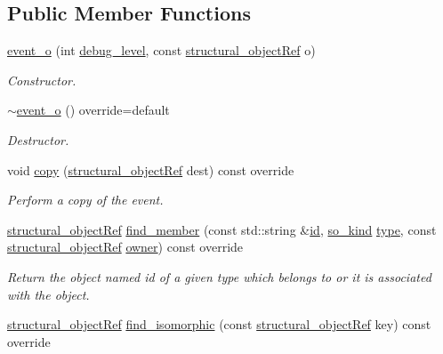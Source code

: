 \subsection*{Public Member Functions}
\begin{DoxyCompactItemize}
\item 
\hyperlink{classevent__o_a1c84057bbc0bd928bc9245e9cb7fed89}{event\+\_\+o} (int \hyperlink{classstructural__object_ac2744292aa7f0fca3742133d16bb3201}{debug\+\_\+level}, const \hyperlink{structural__objects_8hpp_a8ea5f8cc50ab8f4c31e2751074ff60b2}{structural\+\_\+object\+Ref} o)
\begin{DoxyCompactList}\small\item\em Constructor. \end{DoxyCompactList}\item 
\hyperlink{classevent__o_aa0e27b6701501b500ec7ab11acee2eea}{$\sim$event\+\_\+o} () override=default
\begin{DoxyCompactList}\small\item\em Destructor. \end{DoxyCompactList}\item 
void \hyperlink{classevent__o_acdd317b74f63cf9e7c5fe01aa5bbeb39}{copy} (\hyperlink{structural__objects_8hpp_a8ea5f8cc50ab8f4c31e2751074ff60b2}{structural\+\_\+object\+Ref} dest) const override
\begin{DoxyCompactList}\small\item\em Perform a copy of the event. \end{DoxyCompactList}\item 
\hyperlink{structural__objects_8hpp_a8ea5f8cc50ab8f4c31e2751074ff60b2}{structural\+\_\+object\+Ref} \hyperlink{classevent__o_a8755739f562809b1b44a15e8925f54af}{find\+\_\+member} (const std\+::string \&\hyperlink{classstructural__object_a841a75f6e349ff7c1987dc92d4ac33a6}{id}, \hyperlink{structural__objects_8hpp_acf52399aecacb7952e414c5746ce6439}{so\+\_\+kind} \hyperlink{classstructural__object_a9a7159ce4c8da9984f256d9032f49778}{type}, const \hyperlink{structural__objects_8hpp_a8ea5f8cc50ab8f4c31e2751074ff60b2}{structural\+\_\+object\+Ref} \hyperlink{classstructural__object_a3e96b3e00b8a78adfc44872d82e186ea}{owner}) const override
\begin{DoxyCompactList}\small\item\em Return the object named id of a given type which belongs to or it is associated with the object. \end{DoxyCompactList}\item 
\hyperlink{structural__objects_8hpp_a8ea5f8cc50ab8f4c31e2751074ff60b2}{structural\+\_\+object\+Ref} \hyperlink{classevent__o_ae1021e72b16d1d6259bd5f494780ba95}{find\+\_\+isomorphic} (const \hyperlink{structural__objects_8hpp_a8ea5f8cc50ab8f4c31e2751074ff60b2}{structural\+\_\+object\+Ref} key) const override

\end{DoxyCompactItemize}
